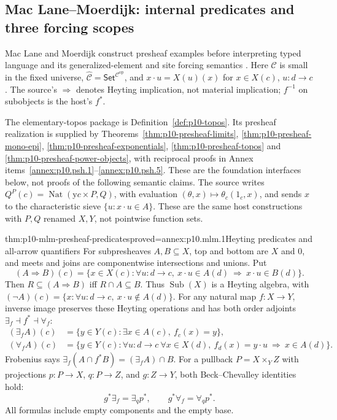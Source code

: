\subsection{Mac Lane--Moerdijk: internal predicates and three forcing scopes}
\label{sec:p10-n-d-023-source-03}

Mac Lane and Moerdijk construct presheaf examples before interpreting typed
language and its generalized-element and site forcing semantics
\cite[I\S4, pp.~35--38; I\S6, pp.~44--47; VI\S5--7, pp.~296--318]
{MacLaneMoerdijk1992}. Here \(\mathcal C\) is small in the fixed universe,
\(\widehat{\mathcal C}=\mathsf{Set}^{\mathcal C^{\mathrm{op}}}\), and
\(x\cdot u=X(u)(x)\) for \(x\in X(c)\), \(u:d\to c\).
The source's \(\Rightarrow\) denotes Heyting implication, not material
implication; \(f^{-1}\) on subobjects is the host's \(f^*\).

The elementary-topos package is Definition~\ref{def:p10-topos}.
Its presheaf realization is supplied by Theorems~\ref{thm:p10-presheaf-limits},
\ref{thm:p10-presheaf-mono-epi}, \ref{thm:p10-presheaf-exponentials},
\ref{thm:p10-presheaf-topos} and \ref{thm:p10-presheaf-power-objects}, with
reciprocal proofs in Annex items~\ref{annex:p10.psh.1}--\ref{annex:p10.psh.5}.
These are the foundation interfaces below, not proofs of the following
semantic claims. The source writes \(Q^P(c)=\operatorname{Nat}(\mathrm yc\times
P,Q)\), with evaluation \((\theta,x)\mapsto\theta_c(1_c,x)\), and sends \(x\)
to the characteristic sieve \(\{u:x\cdot u\in A\}\). These are the same
host constructions with \(P,Q\) renamed \(X,Y\), not pointwise function sets.

\begin{hbtheorem}{thm:p10-mlm-presheaf-predicates}{proved=annex:p10.mlm.1}{Heyting predicates and all-arrow quantifiers}
For subpresheaves \(A,B\subseteq X\), top and bottom are \(X\) and \(0\),
and meets and joins are componentwise intersections and unions. Put
\[
 (A\Rightarrow B)(c)=\{x\in X(c):\forall u:d\to c,\
          x\cdot u\in A(d)\ \Longrightarrow\ x\cdot u\in B(d)\}.
\]
Then \(R\subseteq(A\Rightarrow B)\) iff \(R\cap A\subseteq B\).
Thus \(\operatorname{Sub}(X)\) is a Heyting algebra, with
\((\neg A)(c)=\{x:\forall u:d\to c,\ x\cdot u\notin A(d)\}\).
For any natural map \(f:X\to Y\), inverse image preserves these Heyting
operations and has both order adjoints \(\exists_f\dashv f^*\dashv\forall_f\):
\[
\begin{aligned}
 (\exists_f A)(c)&=\{y\in Y(c):\exists x\in A(c),\ f_c(x)=y\},\\
 (\forall_f A)(c)&=\{y\in Y(c):\forall u:d\to c\ \forall x\in X(d),\
                  f_d(x)=y\cdot u\ \Longrightarrow\ x\in A(d)\}.
\end{aligned}
\]
Frobenius says \(\exists_f(A\cap f^*B)=(\exists_f A)\cap B\).
For a pullback \(P=X\times_Y Z\) with projections \(p:P\to X\), \(q:P\to Z\),
and \(g:Z\to Y\), both Beck--Chevalley identities hold:
\[
             g^*\exists_f=\exists_qp^*,\qquad
             g^*\forall_f=\forall_qp^*.
\]
All formulas include empty components and the empty base.
\end{hbtheorem}

